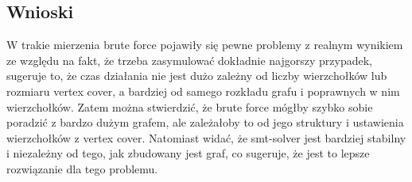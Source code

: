 \documentclass{article}
\begin{document}
\subsection{Wnioski}
W trakie mierzenia brute force pojawiły się pewne problemy z realnym wynikiem ze względu na fakt, że trzeba zasymulować dokładnie najgorszy przypadek, sugeruje to, 
że czas działania nie jest dużo zależny od liczby wierzchołków lub rozmiaru vertex cover, a bardziej od samego rozkładu grafu i poprawnych w nim wierzchołków.
Zatem można stwierdzić, że brute force mógłby szybko sobie poradzić z bardzo dużym grafem, ale zależałoby to od jego struktury i ustawienia wierzchołków z vertex cover.
Natomiast widać, że smt-solver jest bardziej stabilny i niezależny od tego, jak zbudowany jest graf, co sugeruje, że jest to lepsze rozwiązanie dla tego problemu.
\end{document}
